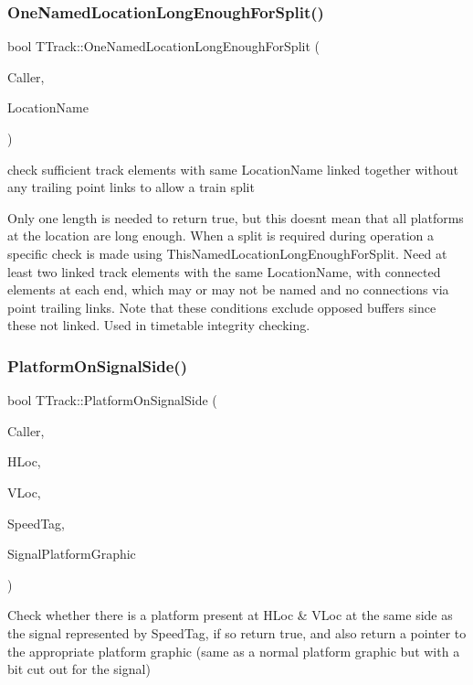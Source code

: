 \subsubsection{\texorpdfstring{One\+Named\+Location\+Long\+Enough\+For\+Split()}{OneNamedLocationLongEnoughForSplit()}}
{\footnotesize\ttfamily bool T\+Track\+::\+One\+Named\+Location\+Long\+Enough\+For\+Split (\begin{DoxyParamCaption}\item[{int}]{Caller,  }\item[{Ansi\+String}]{Location\+Name }\end{DoxyParamCaption})}

check sufficient track elements with same Location\+Name linked together without any trailing point links to allow a train split

Only one length is needed to return true, but this doesn\textquotesingle{}t mean that all platforms at the location are long enough. When a split is required during operation a specific check is made using This\+Named\+Location\+Long\+Enough\+For\+Split. Need at least two linked track elements with the same Location\+Name, with connected elements at each end, which may or may not be named and no connections via point trailing links. Note that these conditions exclude opposed buffers since these not linked. Used in timetable integrity checking. \mbox{\label{class_t_track_a7c2888cb7acea2b9c65c5f9cc538df66}} 
\subsubsection{\texorpdfstring{Platform\+On\+Signal\+Side()}{PlatformOnSignalSide()}}
{\footnotesize\ttfamily bool T\+Track\+::\+Platform\+On\+Signal\+Side (\begin{DoxyParamCaption}\item[{int}]{Caller,  }\item[{int}]{H\+Loc,  }\item[{int}]{V\+Loc,  }\item[{int}]{Speed\+Tag,  }\item[{Graphics\+::\+T\+Bitmap $\ast$\&}]{Signal\+Platform\+Graphic }\end{DoxyParamCaption})}

Check whether there is a platform present at H\+Loc \& V\+Loc at the same side as the signal represented by Speed\+Tag, if so return true, and also return a pointer to the appropriate platform graphic (same as a normal platform graphic but with a bit cut out for the signal) \mbox{\label{class_t_track_a4385335a5bb0891cdbf2b6d0f0aabdf2}} 

